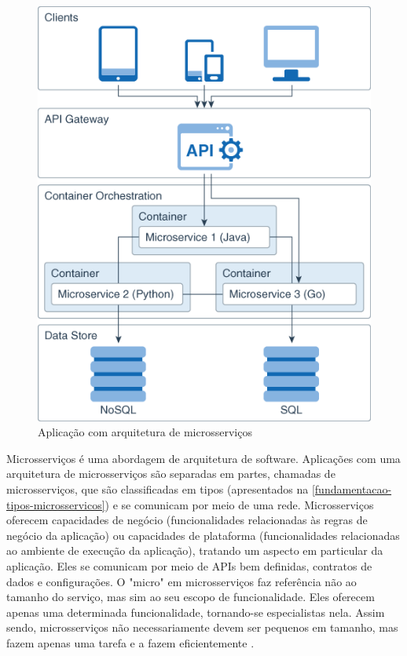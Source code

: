 \begin{figure}[htb]
	\caption{\label{figura_arquitetura_microsservicos}Aplicação com arquitetura de microsserviços}
	\begin{center}
	    \includegraphics[scale=0.5]{Imagens/microservice_architecture.png}
	\end{center}
\end{figure}

Microsserviços é uma abordagem de arquitetura de software. Aplicações com uma arquitetura de microsserviços são separadas em partes, chamadas de microsserviços, que são classificadas em tipos (apresentados na \autoref{fundamentacao-tipos-microsservicos}) e se comunicam por meio de uma rede. Microsserviços oferecem capacidades de negócio (funcionalidades relacionadas às regras de negócio da aplicação) ou capacidades de plataforma (funcionalidades relacionadas ao ambiente de execução da aplicação), tratando um aspecto em particular da aplicação. Eles se comunicam por meio de APIs bem definidas, contratos de dados e configurações. O "micro" em microsserviços faz referência não ao tamanho do serviço, mas sim ao seu escopo de funcionalidade. Eles oferecem apenas uma determinada funcionalidade, tornando-se especialistas nela. Assim sendo, microsserviços não necessariamente devem ser pequenos em tamanho, mas fazem apenas uma tarefa e a fazem eficientemente \cite{Familiar2015}.
 
